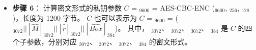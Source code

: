 \documentclass[main\_\_CN.tex]{subfiles}
\begin{document}
\begin{itemize}
    \item {\bfseries 步骤 6}：
            计算密文形式的私钥参数 \begin{math}C\end{math} = \begin{math}[C]_{9600}\end{math} =
            AES-CBC-ENC (\begin{math}[P]_{9600}\end{math}, \begin{math}[RSA\_DS\_KEY]_{256}\end{math}, \begin{math}[IV]_{128}\end{math})，长度为 1200 字节。
            \begin{math}C\end{math} 也可以表示为
            \begin{math}C\end{math} = \begin{math}[C]_{9600}\end{math} =
            (\begin{math}
            [\widehat{Y}]_{3072} ||
            [\widehat{M}]_{3072} ||
            [\widehat{ \overline{r} }]_{3072} ||
            [\widehat{Box}]_{384}
            \end{math})。
            其中，
            \begin{math} [\widehat{Y}]_{3072} \end{math}、
            \begin{math} [\widehat{M}]_{3072} \end{math}、
            \begin{math} [\widehat{ \overline{r} }]_{3072} \end{math}、
            \begin{math} [\widehat{Box}]_{384} \end{math}
            是 \begin{math}C\end{math} 的四个子参数，分别对应
            \begin{math} [Y]_{3072} \end{math}、
            \begin{math} [M]_{3072} \end{math}、
            \begin{math} [\overline{r}]_{3072} \end{math}、
            \begin{math} [Box]_{384} \end{math}
            的密文形式。

\end{itemize}
\end{document}
